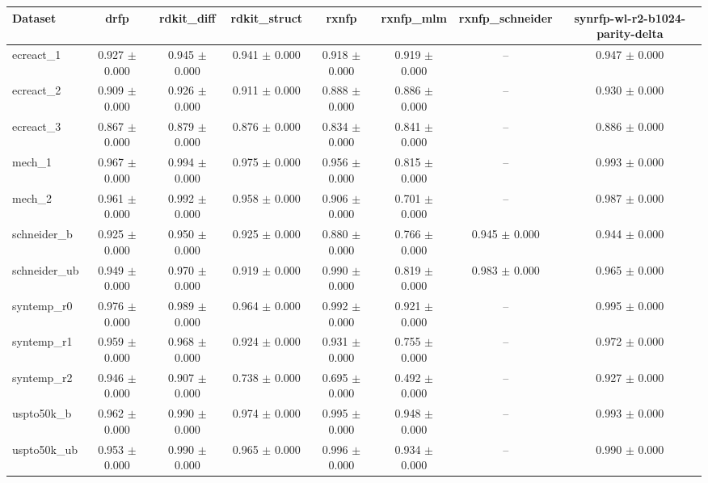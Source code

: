 \begin{tabular}{lccccccc}
\toprule
Dataset & drfp & rdkit\_diff & rdkit\_struct & rxnfp & rxnfp\_mlm & rxnfp\_schneider & synrfp-wl-r2-b1024-parity-delta \\
\midrule
ecreact\_1 & 0.927 $\pm$ 0.000 & 0.945 $\pm$ 0.000 & 0.941 $\pm$ 0.000 & 0.918 $\pm$ 0.000 & 0.919 $\pm$ 0.000 & -- & 0.947 $\pm$ 0.000 \\
ecreact\_2 & 0.909 $\pm$ 0.000 & 0.926 $\pm$ 0.000 & 0.911 $\pm$ 0.000 & 0.888 $\pm$ 0.000 & 0.886 $\pm$ 0.000 & -- & 0.930 $\pm$ 0.000 \\
ecreact\_3 & 0.867 $\pm$ 0.000 & 0.879 $\pm$ 0.000 & 0.876 $\pm$ 0.000 & 0.834 $\pm$ 0.000 & 0.841 $\pm$ 0.000 & -- & 0.886 $\pm$ 0.000 \\
mech\_1 & 0.967 $\pm$ 0.000 & 0.994 $\pm$ 0.000 & 0.975 $\pm$ 0.000 & 0.956 $\pm$ 0.000 & 0.815 $\pm$ 0.000 & -- & 0.993 $\pm$ 0.000 \\
mech\_2 & 0.961 $\pm$ 0.000 & 0.992 $\pm$ 0.000 & 0.958 $\pm$ 0.000 & 0.906 $\pm$ 0.000 & 0.701 $\pm$ 0.000 & -- & 0.987 $\pm$ 0.000 \\
schneider\_b & 0.925 $\pm$ 0.000 & 0.950 $\pm$ 0.000 & 0.925 $\pm$ 0.000 & 0.880 $\pm$ 0.000 & 0.766 $\pm$ 0.000 & 0.945 $\pm$ 0.000 & 0.944 $\pm$ 0.000 \\
schneider\_ub & 0.949 $\pm$ 0.000 & 0.970 $\pm$ 0.000 & 0.919 $\pm$ 0.000 & 0.990 $\pm$ 0.000 & 0.819 $\pm$ 0.000 & 0.983 $\pm$ 0.000 & 0.965 $\pm$ 0.000 \\
syntemp\_r0 & 0.976 $\pm$ 0.000 & 0.989 $\pm$ 0.000 & 0.964 $\pm$ 0.000 & 0.992 $\pm$ 0.000 & 0.921 $\pm$ 0.000 & -- & 0.995 $\pm$ 0.000 \\
syntemp\_r1 & 0.959 $\pm$ 0.000 & 0.968 $\pm$ 0.000 & 0.924 $\pm$ 0.000 & 0.931 $\pm$ 0.000 & 0.755 $\pm$ 0.000 & -- & 0.972 $\pm$ 0.000 \\
syntemp\_r2 & 0.946 $\pm$ 0.000 & 0.907 $\pm$ 0.000 & 0.738 $\pm$ 0.000 & 0.695 $\pm$ 0.000 & 0.492 $\pm$ 0.000 & -- & 0.927 $\pm$ 0.000 \\
uspto50k\_b & 0.962 $\pm$ 0.000 & 0.990 $\pm$ 0.000 & 0.974 $\pm$ 0.000 & 0.995 $\pm$ 0.000 & 0.948 $\pm$ 0.000 & -- & 0.993 $\pm$ 0.000 \\
uspto50k\_ub & 0.953 $\pm$ 0.000 & 0.990 $\pm$ 0.000 & 0.965 $\pm$ 0.000 & 0.996 $\pm$ 0.000 & 0.934 $\pm$ 0.000 & -- & 0.990 $\pm$ 0.000 \\
\bottomrule
\end{tabular}
